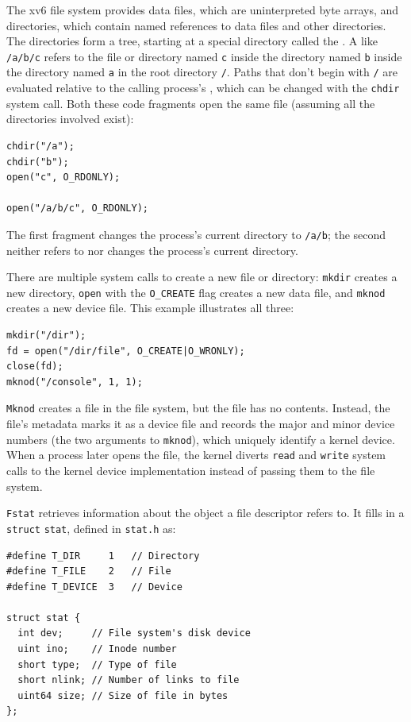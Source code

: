The xv6 file system provides data files,
which are uninterpreted byte arrays,
and directories, which
contain named references to data files and other directories.
The directories form a tree, starting
at a special directory called the 
.
A 
like
\lstinline{/a/b/c}
refers to the file or directory named
\lstinline{c}
inside the directory named
\lstinline{b}
inside the directory named
\lstinline{a}
in the root directory
\lstinline{/}.
Paths that don't begin with
\lstinline{/}
are evaluated relative to the calling process's
,
which can be changed with the
\lstinline{chdir}
system call.
Both these code fragments open the same file
(assuming all the directories involved exist):
\begin{lstlisting}[]
chdir("/a");
chdir("b");
open("c", O_RDONLY);

open("/a/b/c", O_RDONLY);
\end{lstlisting}
The first fragment changes the process's current directory to
\lstinline{/a/b};
the second neither refers to nor changes the process's current directory.

There are multiple system calls to create a new file or directory:
\lstinline{mkdir}
creates a new directory,
\lstinline{open}
with the
\lstinline{O_CREATE}
flag creates a new data file,
and
\lstinline{mknod}
creates a new device file.
This example illustrates all three:
\begin{lstlisting}[]
mkdir("/dir");
fd = open("/dir/file", O_CREATE|O_WRONLY);
close(fd);
mknod("/console", 1, 1);
\end{lstlisting}
\lstinline{Mknod}
creates a file in the file system,
but the file has no contents.
Instead, the file's metadata marks it as a device file
and records the major and minor device numbers
(the two arguments to 
\lstinline{mknod}),
which uniquely identify a kernel device.
When a process later opens the file, the kernel
diverts
\lstinline{read}
and
\lstinline{write}
system calls to the kernel device implementation
instead of passing them to the file system.

\lstinline{Fstat}
retrieves information about the object a file
descriptor refers to.
It fills in a
\lstinline{struct}
\lstinline{stat},
defined in
\lstinline{stat.h} 
as:
\begin{lstlisting}[]
#define T_DIR     1   // Directory
#define T_FILE    2   // File
#define T_DEVICE  3   // Device

struct stat {
  int dev;     // File system's disk device
  uint ino;    // Inode number
  short type;  // Type of file
  short nlink; // Number of links to file
  uint64 size; // Size of file in bytes
};
\end{lstlisting}

